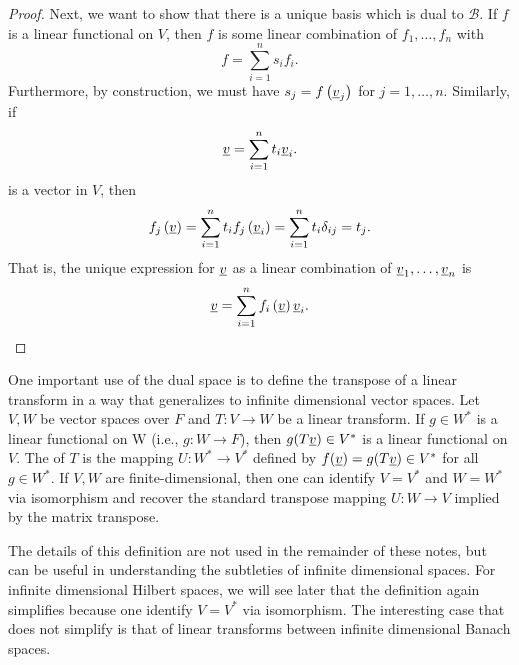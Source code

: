 \begin{proof}
Next, we want to show that there is a unique basis which is dual to $\mathcal{B}$.
If $f$ is a linear functional on $V$, then $f$ is some linear combination of $f_1, \ldots, f_n$ with
\begin{equation*}
f = \sum_{i=1}^n s_i f_i .
\end{equation*}
Furthermore, by construction, we must have $s_j = f \left( \underline{v}_j \right)$ for $j = 1, \ldots, n$.
Similarly, if
\begin{equation*}
\underline{v} = \sum_{i=1}^n t_i \underline{v}_i .
\end{equation*}
is a vector in $V$, then
\begin{equation*}
f_j \left( \underline{v} \right) = \sum_{i=1}^n t_i f_j \left( \underline{v}_i \right)
= \sum_{i=1}^n t_i \delta_{ij} = t_j .
\end{equation*}
That is, the unique expression for $\underline{v}$ as a linear combination of $\underline{v}_1, \ldots, \underline{v}_n$ is
\begin{equation*}
\underline{v} = \sum_{i=1}^n f_i \left( \underline{v} \right) \underline{v}_i .
\end{equation*}
\end{proof}

One important use of the dual space is to define the transpose of a linear transform in a way that generalizes to infinite dimensional vector spaces.
Let $V,W$ be vector spaces over $F$ and $T : V \rightarrow W$ be a linear transform.
If $g \in W^*$ is a linear functional on W (i.e., $g: W \rightarrow F$), then $g(T\underline{v})\in V^*$ is a linear functional on $V$.
The  of $T$ is the mapping $U : W^* \rightarrow V^*$ defined by $f(\underline{v})=g(T\underline{v})\in V^*$ for all $g\in W^*$.
If $V,W$ are finite-dimensional, then one can identify $V=V^*$ and $W=W^*$ via isomorphism and recover the standard transpose mapping $U: W \rightarrow V$ implied by the matrix transpose.

The details of this definition are not used in the remainder of these notes, but can be useful in understanding the subtleties of infinite dimensional spaces.
For infinite dimensional Hilbert spaces, we will see later that the definition again simplifies because one identify $V=V^*$ via isomorphism.
The interesting case that does not simplify is that of linear transforms between infinite dimensional Banach spaces.
 


